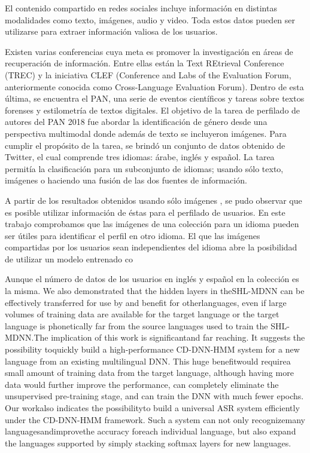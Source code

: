 \documentclass[runningheads]{llncs}
\begin{document}
El contenido compartido en redes sociales incluye información 
en distintas modalidades como texto, imágenes, audio y video.
Toda estos datos pueden ser utilizarse para extraer información
valiosa de los usuarios. 

Existen varias conferencias cuya meta 
es promover la investigación en áreas de recuperación
de información. Entre ellas están la Text REtrieval Conference (TREC) y la 
iniciativa CLEF (Conference and Labs of the Evaluation Forum, anteriormente 
conocida como Cross-Language Evaluation Forum). Dentro de esta última, se 
encuentra el PAN, una serie de eventos científicos y tareas sobre textos 
forenses y estilometría de textos digitales\cite{pan}. El objetivo de la tarea
de perfilado de autores del PAN 2018 fue abordar la identificación de género
desde una perspectiva multimodal donde además de texto se
incluyeron imágenes\cite{rangel_rosso_montes-y-gomez_potthast_stein}.
Para cumplir el propósito de la tarea, se brindó un conjunto de datos
obtenido de Twitter, el cual comprende tres idiomas: árabe, inglés y español.
La tarea permitía la clasificación para un subconjunto de idiomas; usando sólo texto, imágenes o haciendo una fusión de las dos fuentes de información.

A partir de los resultados obtenidos usando sólo imágenes 
\cite{rangel_rosso_montes-y-gomez_potthast_stein}, se pudo observar que es posible 
utilizar información de éstas para el perfilado de usuarios.
En este trabajo comprobamos que las imágenes de una colección para un
idioma  pueden ser útiles para identificar el perfil en otro idioma. 
El que las imágenes compartidas por los usuarios sean
independientes del idioma abre la posibilidad de utilizar
un modelo entrenado co 


Aunque el número de datos de los usuarios en inglés y español en la colección es la misma.
We also demonstrated that the hidden layers in theSHL-MDNN can be effectively transferred  for  use  by  and  benefit  for  otherlanguages, even  if  large volumes of  training  data  are  available  for  the  target language or the target language is phonetically far from the source languages used to train the SHL-MDNN.The  implication  of  this  work  is  significantand  far  reaching. It suggests  the  possibility  toquickly  build  a  high-performance  CD-DNN-HMM   system for   a   new   language from   an   existing multilingual DNN. This huge benefitwould requirea small amount of training  data  from  the  target  language,  although  having  more data   would   further   improve   the   performance,   can   completely eliminate  the  unsupervised  pre-training  stage,  and  can  train  the DNN  with   much fewer epochs. Our   workalso   indicates the possibilityto  build  a  universal  ASR  system  efficiently  under  the CD-DNN-HMM framework. Such a system can not only recognizemany  languagesandimprovethe  accuracy foreach  individual language,  but  also  expand  the  languages  supported  by  simply stacking softmax layers for new languages. 
\end{document}
